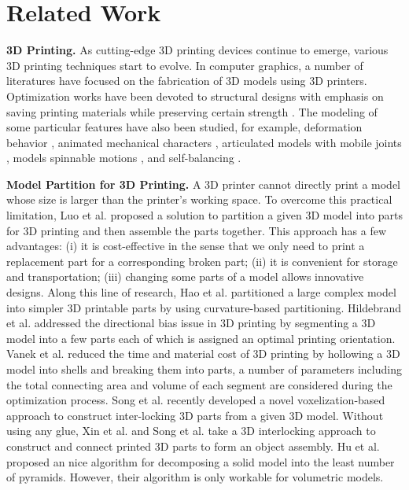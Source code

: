 \section{Related Work}

\textbf{3D Printing.} As cutting-edge 3{D} printing devices continue to emerge, various 3{D} printing techniques start to evolve. In computer graphics, a number of literatures have focused on the fabrication of 3D models using 3D printers. Optimization works have been devoted to structural designs with emphasis on saving printing materials while preserving certain strength \cite{StavaVBCM12,ZhouPZ13,WangWYLTTDCL13,Umetani:2013:CSA,LuSZWFCSTCC14}. The modeling of some particular features have also been studied, for example, deformation behavior \cite{SkourasTCBG13}, animated mechanical characters \cite{CorosTNSFSMB13,CeylanLMAP13}, articulated models with mobile joints \cite{BacherBJP12,CaliCAKSKW12}, models spinnable motions \cite{Bacher14}, and self-balancing \cite{PrevostWLS13}.


\textbf{Model Partition for 3{D} Printing.} A 3D printer cannot directly print a model whose size is larger than the printer's working space. To overcome this practical limitation, Luo et al. \cite{LuoBRM12} proposed a solution to partition a given 3D model into parts for 3D printing and then assemble the parts together. This approach has a few advantages: (i) it is cost-effective in the sense that we only need to print a replacement part for a corresponding broken part; (ii) it is convenient for storage and transportation; (iii) changing some parts of a model allows innovative designs. Along this line of research, Hao et al. \cite{hao2011efficient} partitioned a large complex model into simpler 3D printable parts by using curvature-based partitioning. Hildebrand et al. \cite{HildebrandBA13} addressed the directional bias issue in 3D printing by segmenting a 3D model into a few parts each of which is assigned an optimal printing orientation. Vanek et al. \cite{VanekGBMCSM14} reduced the time and material cost of 3D printing by hollowing a 3D model into shells and breaking them into parts, a number of parameters including the total connecting area and volume of each segment are considered during the optimization process. Song et al. \cite{SongFLF15} recently developed a novel voxelization-based approach to construct inter-locking 3D parts from a given 3D model. Without using any glue, Xin et al. \cite{XinLFWHC11} and Song et al. \cite{SongFC12} take a 3D interlocking approach to construct and connect printed 3D parts to form an object assembly. Hu et al. \cite{Hu_siga14} proposed an nice algorithm for decomposing a solid model into the least number of pyramids. However, their algorithm is only workable for volumetric models.


